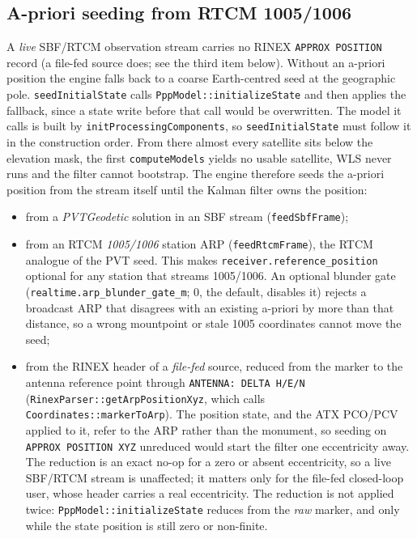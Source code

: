 \documentclass[main.tex]{subfiles}
\begin{document}
\subsection{A-priori seeding from RTCM 1005/1006}\label{sec:rt-apriori}

A \emph{live} SBF/RTCM observation stream carries no RINEX \texttt{APPROX
POSITION} record (a file-fed source does; see the third item below).
Without an a-priori position the engine falls back to a coarse
Earth-centred seed at the geographic pole.  \texttt{seedInitialState}
calls \texttt{PppModel::initializeState} and then applies the fallback,
since a state write before that call would be overwritten.  The model it
calls is built by \texttt{initProcessingComponents}, so
\texttt{seedInitialState} must follow it in the construction order.  From there almost every
satellite sits below the elevation mask, the first
\texttt{computeModels} yields no usable satellite, WLS never runs and
the filter cannot bootstrap.  The engine therefore seeds the a-priori
position from the stream itself until the Kalman filter owns the
position:
\begin{itemize}[leftmargin=*, itemsep=0pt]
\item from a \emph{PVTGeodetic} solution in an SBF stream
      (\texttt{feedSbfFrame});
\item from an RTCM \emph{1005/1006} station ARP
      (\texttt{feedRtcmFrame}), the RTCM analogue of the PVT seed.  This
      makes \texttt{receiver.reference\_position} optional for any
      station that streams 1005/1006.  An optional blunder gate
      (\texttt{realtime.arp\_blunder\_gate\_m}; 0, the
      default, disables it) rejects a broadcast ARP that disagrees with
      an existing a-priori by more than that distance, so a wrong
      mountpoint or stale 1005 coordinates cannot move the seed;
\item from the RINEX header of a \emph{file-fed} source, reduced from the
      marker to the antenna reference point through
      \texttt{ANTENNA: DELTA H/E/N}
      (\texttt{RinexParser::getArpPositionXyz}, which calls
      \texttt{Coordinates::markerToArp}).  The position state, and the
      ATX PCO/PCV applied to it, refer to the ARP rather than the
      monument, so seeding on \texttt{APPROX POSITION XYZ} unreduced
      would start the filter one eccentricity away.  The reduction is an
      exact no-op for a zero or absent eccentricity, so a live SBF/RTCM
      stream is unaffected; it matters only for the file-fed closed-loop
      user, whose header carries a real eccentricity.  The reduction
      is not applied twice: \texttt{PppModel::initializeState} reduces
      from the \emph{raw} marker, and only while the state position is
      still zero or non-finite.
\end{itemize}
\end{document}
